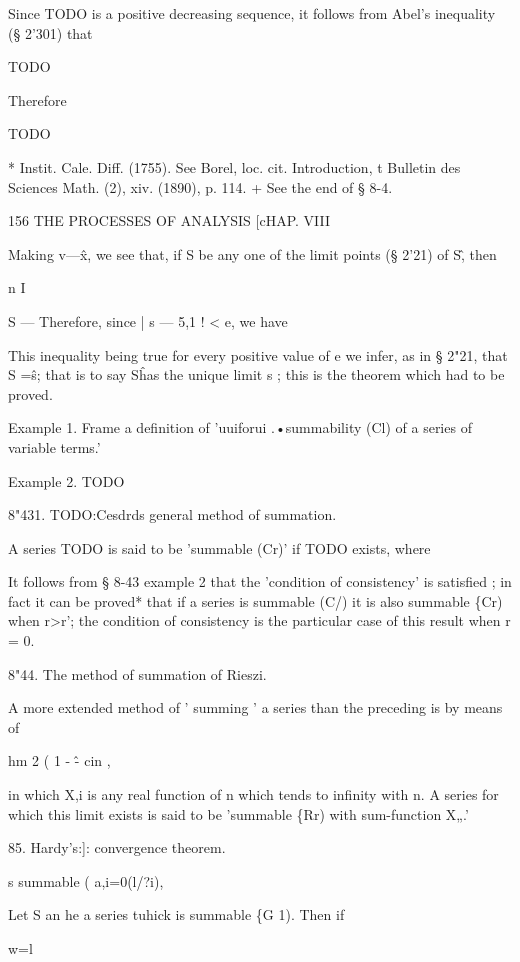 Since TODO is a positive decreasing sequence, it follows 
from Abel's inequality (§ 2'301) that 

TODO

Therefore 

TODO

* Instit. Cale. Diff. (1755). See Borel, loc. cit. Introduction, 
t Bulletin des Sciences Math. (2), xiv. (1890), p. 114. 
+ See the end of § 8-4. 



156 THE PROCESSES OF ANALYSIS [cHAP. VIII 

Making v—\^x, we see that, if S be any one of the limit points (§ 2'21) 
of S\^ , then 

n I 

S — %
Therefore, since | s — 5,1 ! < e, we have 

This inequality being true for every positive value of e we infer, as in § 2"21, 
that S =\^s; that is to say S\^ has the unique limit s ; this is the theorem which 
had to be proved. 

Example 1. Frame a definition of 'uuiforui .•summability (Cl) of a series of variable 
terms.' 

Example 2. TODO

8"431. TODO:Cesdrds general method of summation. 

A series TODO is said to be 'summable (Cr)' if TODO exists, where 

It follows from § 8-43 example 2 that the 'condition of consistency' is satisfied ; in 
fact it can be proved* that if a series is summable (C/) it is also summable \{Cr) when 
r>r'; the condition of consistency is the particular case of this result when r = 0. 

8"44. The method of summation of Rieszi. 

A more extended method of ' summing ' a series than the preceding is by means of 

hm 2 ( 1 - \^- cin , 

in which X,i is any real function of n which tends to infinity with n. A series for which 
this limit exists is said to be 'summable \{Rr) with sum-function X„.' 



85. Hardy's:]: convergence theorem. 

s summable ( 
a,i=0(l/?i), 



Let S an he a series tuhick is summable \{G 1). Then if 

w=l 



